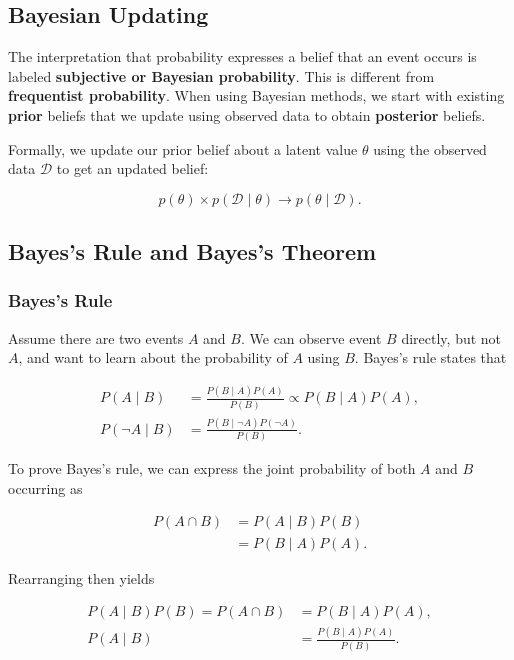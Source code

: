 \subsection{Bayesian Updating}

The interpretation that probability expresses a belief that an event occurs is labeled \textbf{subjective or Bayesian probability}. This is different from \textbf{frequentist probability}. When using Bayesian methods, we start with existing \textbf{prior} beliefs that we update using observed data to obtain \textbf{posterior} beliefs. 

Formally, we update our prior belief about a latent value $\theta$ using the observed data $\mathcal{D}$ to get an updated belief:

\begin{equation}
	p(\theta) \times p(\mathcal{D}\mid\theta) \rightarrow p(\theta \mid \mathcal{D}).
\end{equation}


\subsection{Bayes's Rule and Bayes's Theorem}

\subsubsection{Bayes's Rule}

Assume there are two events $A$ and $B$. We can observe event $B$ directly, but not $A$, and want to learn about the probability of $A$ using $B$. Bayes's rule states that 

\begin{align}
	P(A\mid B) &= \frac{P(B\mid A)P(A)}{P(B)}\propto P(B\mid A)P(A), \\
	\nonumber P(\lnot A \mid B) &= \frac{P(B\mid \lnot A)P(\lnot A)}{P(B)}.
\end{align}

To prove Bayes's rule, we can express the joint probability of both $A$ and $B$ occurring as

\begin{align*}
	P(A\cap B) &= P(A\mid B)P(B) \\
	&= P(B\mid A)P(A).
\end{align*}

Rearranging then yields

\begin{align*}
	P(A\mid B)P(B) = P(A\cap B) &= P(B\mid A)P(A), \\
	P(A\mid B) &= \frac{P(B\mid A)P(A)}{P(B)}.
\end{align*}

